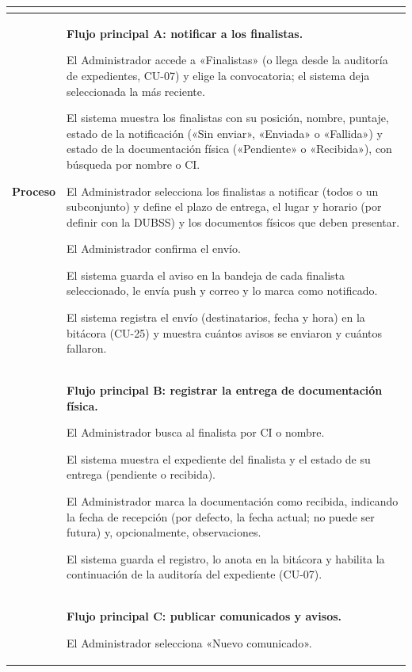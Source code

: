 \begin{longtable}{>{\raggedright\arraybackslash}p{2.9cm} >{\raggedright\arraybackslash}p{12.6cm}}
\begin{cuvin}
\end{cuvin} \\
\midrule
\textbf{Proceso} & \textbf{Flujo principal A: notificar a los finalistas.}
\begin{cupasos}
    \item El Administrador accede a «Finalistas» (o llega desde la auditoría de expedientes, CU-07) y elige la convocatoria; el sistema deja seleccionada la más reciente.
    \item El sistema muestra los finalistas con su posición, nombre, puntaje, estado de la notificación («Sin enviar», «Enviada» o «Fallida») y estado de la documentación física («Pendiente» o «Recibida»), con búsqueda por nombre o CI.
    \item El Administrador selecciona los finalistas a notificar (todos o un subconjunto) y define el plazo de entrega, el lugar y horario (por definir con la DUBSS) y los documentos físicos que deben presentar.
    \item El Administrador confirma el envío.
    \item El sistema guarda el aviso en la bandeja de cada finalista seleccionado, le envía push y correo y lo marca como notificado.
    \item El sistema registra el envío (destinatarios, fecha y hora) en la bitácora (CU-25) y muestra cuántos avisos se enviaron y cuántos fallaron.
\end{cupasos} \\
 & \textbf{Flujo principal B: registrar la entrega de documentación física.}
\begin{cupasos}
    \item El Administrador busca al finalista por CI o nombre.
    \item El sistema muestra el expediente del finalista y el estado de su entrega (pendiente o recibida).
    \item El Administrador marca la documentación como recibida, indicando la fecha de recepción (por defecto, la fecha actual; no puede ser futura) y, opcionalmente, observaciones.
    \item El sistema guarda el registro, lo anota en la bitácora y habilita la continuación de la auditoría del expediente (CU-07).
\end{cupasos} \\
 & \textbf{Flujo principal C: publicar comunicados y avisos.}
\begin{cupasos}
    \item El Administrador selecciona «Nuevo comunicado».

\end{cupasos}
\end{longtable}
